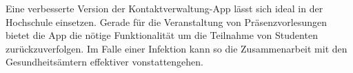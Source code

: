 Eine verbesserte Version der Kontaktverwaltung-App lässt sich ideal in der Hochschule einsetzen. 
Gerade für die Veranstaltung von Präsenzvorlesungen bietet die App die nötige Funktionalität um die Teilnahme von Studenten zurückzuverfolgen.
Im Falle einer Infektion kann so die Zusammenarbeit mit den Gesundheitsämtern effektiver vonstattengehen.